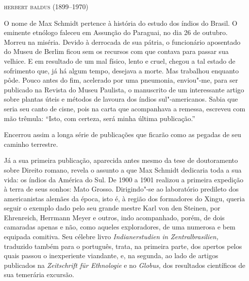 \begin{flushright}
\textsc{herbert baldus (1899--1970)}\medskip
\end{flushright}

O nome de Max Schmidt pertence à história do estudo dos índios do
Brasil. O eminente etnólogo faleceu em Assunção do Paraguai, no dia 26
de outubro. Morreu na miséria. Devido à derrocada de sua pátria, o
funcionário aposentado do Museu de Berlim ficou sem os recursos com que
contava para passar sua velhice. E em resultado de um mal físico, lento
e cruel, chegou a tal estado de sofrimento que, já há algum tempo,
desejava a morte. Mas trabalhou enquanto pôde. Pouco antes do fim,
acelerado por uma pneumonia, enviou"-me, para ser publicado na Revista
do Museu Paulista, o manuscrito de um interessante artigo sobre plantas
úteis e métodos de lavoura dos índios sul"-americanos. Sabia que seria
seu canto de cisne, pois na carta que acompanhava a remessa, escreveu
com mão trêmula: ``Isto, com certeza, será minha última publicação.''%

Encerrou assim a longa série de publicações que ficarão como as pegadas
de seu caminho terrestre.


Já a sua primeira publicação, aparecida antes mesmo da tese de
doutoramento sobre Direito romano, revela o assunto a que Max Schmidt
dedicaria toda a sua vida: os índios da América do Sul. De 1900 a 1901
realizou a primeira expedição à terra de seus sonhos: Mato Grosso.
Dirigindo"-se ao laboratório predileto dos americanistas alemães da
época, isto é, à região dos formadores do Xingu, queria seguir o exemplo
dado pelo seu grande mestre Karl von den Steinen, por Ehrenreich,
Herrmann Meyer e outros, indo acompanhado, porém, de dois camaradas
apenas e não, como aqueles exploradores, de uma numerosa e bem equipada
comitiva. Seu célebre livro \textit{Indianerstudien in Zentralbrasilien,}
traduzido também para o português, trata, na primeira parte, dos apertos
pelos quais passou o inexperiente viandante, e, na segunda, ao lado de
artigos publicados na \textit{Zeitschrift für Ethnologie} e no
\textit{Globus,} dos resultados científicos de sua temerária excursão.


